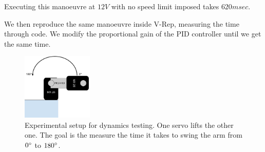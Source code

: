 Executing this manoeuvre at $12V$ with no speed limit imposed takes $620msec$.

We then reproduce the same manoeuvre inside V-Rep, measuring the time through code. We modify the proportional gain of the PID controller until we get the same time.

\begin{figure}[htp]
\center
    \includegraphics[width = 0.3\textwidth]{figures/exp2}
    \caption[Experimental setup dynamics testing]{Experimental setup for dynamics testing. One servo lifts the other one. The goal is the measure the time it takes to swing the arm from $0\degree$ to $180\degree$.}
    \label{fig:exp2}
\end{figure}